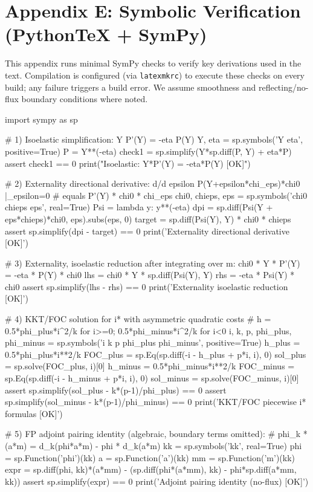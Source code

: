 ﻿\documentclass[11pt,letterpaper,oneside]{article}
\numberwithin{equation}{section}
\newcommand{\1}{\mathbf{1}}
\begin{document}
\section{Appendix E: Symbolic Verification (PythonTeX + SymPy)}\label{app:verification}

\noindent This appendix runs minimal SymPy checks to verify key derivations used in the text. Compilation is configured (via \texttt{latexmkrc}) to execute these checks on every build; any failure triggers a build error. We assume smoothness and reflecting/no-flux boundary conditions where noted.

\begin{pyconsole}
import sympy as sp

# 1) Isoelastic simplification:  Y P'(Y) = -eta P(Y)
Y, eta = sp.symbols('Y eta', positive=True)
P = Y**(-eta)
check1 = sp.simplify(Y*sp.diff(P, Y) + eta*P)
assert check1 == 0
print("Isoelastic: Y*P'(Y) = -eta*P(Y)  [OK]")

# 2) Externality directional derivative:  d/d epsilon P(Y+epsilon*chi_eps)*chi0 |_{epsilon=0}
#     equals P'(Y) * chi0 * chi_eps
chi0, chieps, eps = sp.symbols('chi0 chieps eps', real=True)
Psi = lambda y: y**(-eta)
dpi = sp.diff(Psi(Y + eps*chieps)*chi0, eps).subs(eps, 0)
target = sp.diff(Psi(Y), Y) * chi0 * chieps
assert sp.simplify(dpi - target) == 0
print('Externality directional derivative  [OK]')

# 3) Externality, isoelastic reduction after integrating over m:  chi0 * Y * P'(Y) = -eta * P(Y) * chi0
lhs = chi0 * Y * sp.diff(Psi(Y), Y)
rhs = -eta * Psi(Y) * chi0
assert sp.simplify(lhs - rhs) == 0
print('Externality isoelastic reduction   [OK]')

# 4) KKT/FOC solution for i* with asymmetric quadratic costs
#    h = 0.5*phi_plus*i^2/k for i>=0;   0.5*phi_minus*i^2/k for i<0
i, k, p, phi_plus, phi_minus = sp.symbols('i k p phi_plus phi_minus', positive=True)
h_plus  = 0.5*phi_plus*i**2/k
FOC_plus  = sp.Eq(sp.diff(-i - h_plus + p*i, i), 0)
sol_plus  = sp.solve(FOC_plus, i)[0]
h_minus = 0.5*phi_minus*i**2/k
FOC_minus = sp.Eq(sp.diff(-i - h_minus + p*i, i), 0)
sol_minus = sp.solve(FOC_minus, i)[0]
assert sp.simplify(sol_plus  - k*(p-1)/phi_plus)  == 0
assert sp.simplify(sol_minus - k*(p-1)/phi_minus) == 0
print('KKT/FOC piecewise i* formulas     [OK]')

# 5) FP adjoint pairing identity (algebraic, boundary terms omitted):
#    phi_k * (a*m) = d_k(phi*a*m) - phi * d_k(a*m)
kk = sp.symbols('kk', real=True)
phi = sp.Function('phi')(kk)
a   = sp.Function('a')(kk)
mm  = sp.Function('m')(kk)
expr = sp.diff(phi, kk)*(a*mm) - (sp.diff(phi*(a*mm), kk) - phi*sp.diff(a*mm, kk))
assert sp.simplify(expr) == 0
print('Adjoint pairing identity (no-flux) [OK]')


\end{pyconsole}
\end{document}

